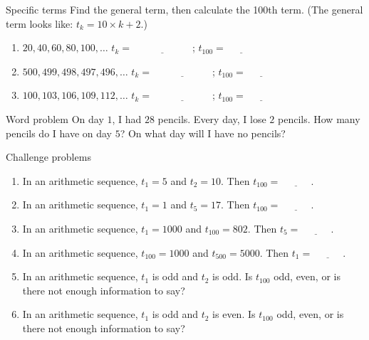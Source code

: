 \documentclass[12pt,letterpaper]{article}
\begin{document}
\begin{problem}{Specific terms}
 Find the general term, then calculate the 100th term. (The general term looks
 like: $t_k = 10 \times k + 2$.)

\begin{enumerate}[\hspace{.5cm}a.]
\item $20, 40, 60, 80, 100, \ldots$ \hfill $t_k = \underline{\hspace{6em}}$;
$t_{100} = \underline{\hspace{3em}}$
\item $500, 499, 498, 497, 496, \ldots$ \hfill $t_k = \underline{\hspace{6em}}$;
$t_{100} = \underline{\hspace{3em}}$
\item $100, 103, 106, 109, 112, \ldots$ \hfill $t_k = \underline{\hspace{6em}}$;
$t_{100} = \underline{\hspace{3em}}$
\end{enumerate}
\end{problem}

\begin{problem}{Word problem}
 On day $1$, I had $28$ pencils. Every day, I lose $2$ pencils. How many pencils
 do I have on day $5$? On what day will I have no pencils?
\end{problem}

\begin{problem}{Challenge problems}
  \begin{enumerate}[\hspace{.5cm}a.]
  \item In an arithmetic sequence, $t_1 = 5$ and $t_2 = 10$. Then $t_{100} =
  \underline{\hspace{3em}}$.
  \item In an arithmetic sequence, $t_1 = 1$ and $t_5 = 17$. Then $t_{100} =
  \underline{\hspace{3em}}$.
  \item In an arithmetic sequence, $t_1 = 1000$ and $t_{100} = 802$. Then
  $t_{5} = \underline{\hspace{3em}}$.
  \item In an arithmetic sequence, $t_{100} = 1000$ and $t_{500} = 5000$. Then
  $t_{1} = \underline{\hspace{3em}}$.
  \item In an arithmetic sequence, $t_1$ is odd and $t_2$ is odd.
  Is $t_{100}$ odd, even, or is there not enough information to say?
  \item In an arithmetic sequence, $t_1$ is odd and $t_2$ is even.
  Is $t_{100}$ odd, even, or is there not enough information to say?
  \end{enumerate}
\end{problem}
\end{document}
